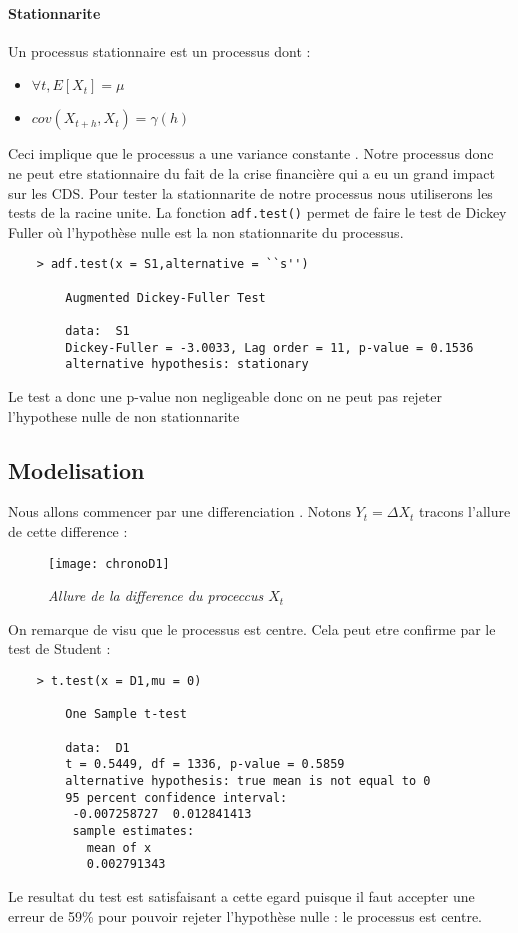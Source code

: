     \paragraph{Stationnarite}
    Un processus stationnaire est un processus dont :
    \begin{itemize}
        \item $\forall t,E[X_t]=\mu$  
        \item $cov(X_{t+h},X_t)=\gamma(h)$ 
    \end{itemize}
    Ceci implique que le processus a une variance constante .
    Notre processus donc ne peut etre stationnaire du fait de la crise
    financière qui a eu un grand impact sur les CDS. 
    Pour tester la stationnarite de notre processus nous utiliserons les tests
    de la racine unite. 
    La fonction \verb+adf.test()+ permet de faire le test de Dickey Fuller
    où l'hypothèse nulle est la non stationnarite du processus.  
    \begin{verbatim}
    > adf.test(x = S1,alternative = ``s'')

        Augmented Dickey-Fuller Test

        data:  S1
        Dickey-Fuller = -3.0033, Lag order = 11, p-value = 0.1536
        alternative hypothesis: stationary
    \end{verbatim}

    Le test a donc une p-value non negligeable donc on ne peut pas rejeter
    l'hypothese nulle de non stationnarite 






    \subsection{Modelisation}
    Nous allons commencer par une differenciation . Notons $Y_t=\Delta X_t$
    tracons l'allure de cette difference :

    \begin{figure}[H]
        \centering 
        \label{fig:chronoD1} 
        \texttt{[image: chronoD1]} 
        \caption{\it Allure de la difference du proceccus $X_t$ } 
    \end{figure} 

    On remarque de visu que le processus est centre. Cela peut etre confirme par
    le test de Student :
    \begin{verbatim}
    > t.test(x = D1,mu = 0)

        One Sample t-test

        data:  D1
        t = 0.5449, df = 1336, p-value = 0.5859
        alternative hypothesis: true mean is not equal to 0
        95 percent confidence interval:
         -0.007258727  0.012841413
         sample estimates:
           mean of x 
           0.002791343 
    \end{verbatim}
    Le resultat du test est satisfaisant a cette egard puisque il faut accepter
    une erreur de 59\% pour pouvoir rejeter l'hypothèse nulle : le processus est
    centre.\\
